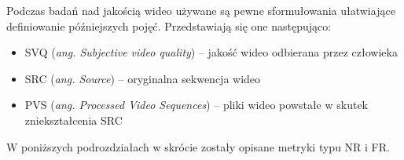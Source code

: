Podczas badań nad jakością  wideo używane są pewne sformułowania ułatwiające definiowanie późniejszych pojęć. Przedstawiają się one następująco:
\begin{itemize}[label=$\bullet$]
	\item SVQ (\emph{ang. Subjective video quality}) -- jakość wideo odbierana przez człowieka
	\item SRC (\emph{ang. Source}) -- oryginalna sekwencja wideo
	\item PVS (\emph{ang. Processed Video Sequences}) -- pliki wideo powstałe w skutek zniekształcenia SRC
\end{itemize}

W poniższych podrozdziałach w skrócie zostały opisane metryki typu NR i FR.


